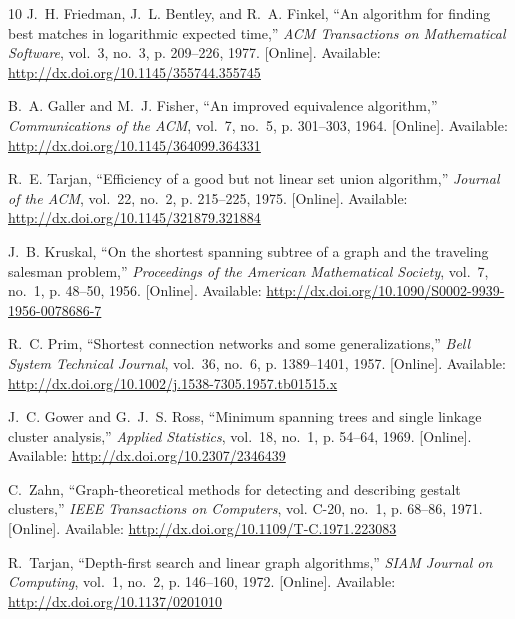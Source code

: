 \documentclass[conference]{IEEEtran}
\begin{document}
\begin{thebibliography}{10}
\BIBentryALTinterwordspacing
J.~H. Friedman, J.~L. Bentley, and R.~A. Finkel, ``An algorithm for finding
  best matches in logarithmic expected time,'' \emph{ACM Transactions on
  Mathematical Software}, vol.~3, no.~3, p. 209–226, 1977. [Online].
  Available: \url{http://dx.doi.org/10.1145/355744.355745}
\BIBentrySTDinterwordspacing

\BIBentryALTinterwordspacing
B.~A. Galler and M.~J. Fisher, ``An improved equivalence algorithm,''
  \emph{Communications of the ACM}, vol.~7, no.~5, p. 301–303, 1964.
  [Online]. Available: \url{http://dx.doi.org/10.1145/364099.364331}
\BIBentrySTDinterwordspacing

\BIBentryALTinterwordspacing
R.~E. Tarjan, ``Efficiency of a good but not linear set union algorithm,''
  \emph{Journal of the ACM}, vol.~22, no.~2, p. 215–225, 1975. [Online].
  Available: \url{http://dx.doi.org/10.1145/321879.321884}
\BIBentrySTDinterwordspacing

\BIBentryALTinterwordspacing
J.~B. Kruskal, ``On the shortest spanning subtree of a graph and the traveling
  salesman problem,'' \emph{Proceedings of the American Mathematical Society},
  vol.~7, no.~1, p. 48–50, 1956. [Online]. Available:
  \url{http://dx.doi.org/10.1090/S0002-9939-1956-0078686-7}
\BIBentrySTDinterwordspacing

\BIBentryALTinterwordspacing
R.~C. Prim, ``Shortest connection networks and some generalizations,''
  \emph{Bell System Technical Journal}, vol.~36, no.~6, p. 1389–1401, 1957.
  [Online]. Available:
  \url{http://dx.doi.org/10.1002/j.1538-7305.1957.tb01515.x}
\BIBentrySTDinterwordspacing

\BIBentryALTinterwordspacing
J.~C. Gower and G.~J.~S. Ross, ``Minimum spanning trees and single linkage
  cluster analysis,'' \emph{Applied Statistics}, vol.~18, no.~1, p. 54–64,
  1969. [Online]. Available: \url{http://dx.doi.org/10.2307/2346439}
\BIBentrySTDinterwordspacing

\BIBentryALTinterwordspacing
C.~Zahn, ``Graph-theoretical methods for detecting and describing gestalt
  clusters,'' \emph{IEEE Transactions on Computers}, vol. C-20, no.~1, p.
  68–86, 1971. [Online]. Available:
  \url{http://dx.doi.org/10.1109/T-C.1971.223083}
\BIBentrySTDinterwordspacing

\BIBentryALTinterwordspacing
R.~Tarjan, ``Depth-first search and linear graph algorithms,'' \emph{SIAM
  Journal on Computing}, vol.~1, no.~2, p. 146–160, 1972. [Online].
  Available: \url{http://dx.doi.org/10.1137/0201010}
\BIBentrySTDinterwordspacing


\end{thebibliography}
\end{document}
